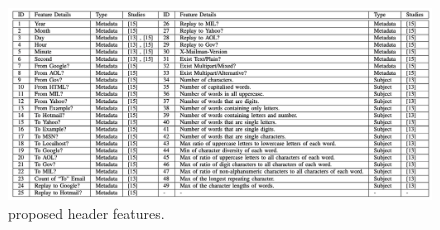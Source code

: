 \begin{figure}[H]
    \includegraphics[width=\linewidth]{figs/headers_article.png}
    \caption{\citet{8257764} proposed header features.}
    \label{fig:c2:header_features}
  \end{figure}